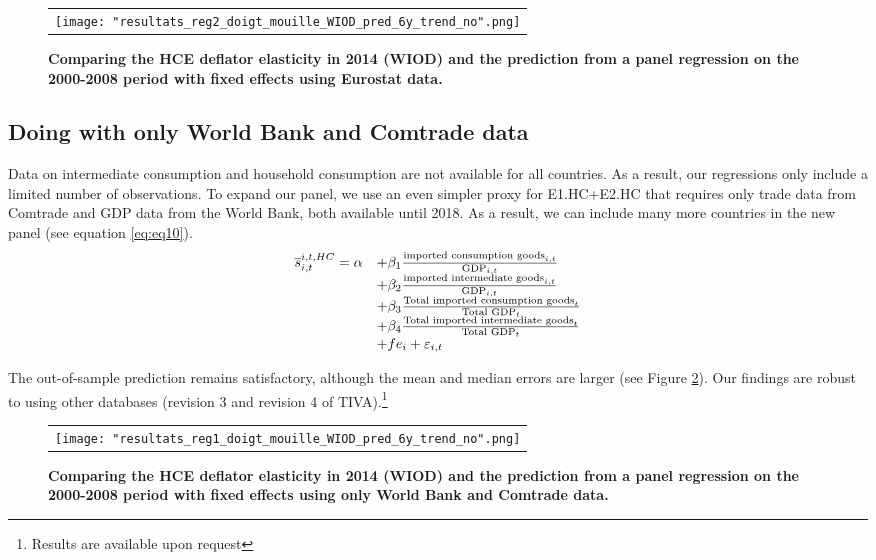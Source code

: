\documentclass[12pt,a4paper]{paper}
\begin{document}
\begin{figure}[H]
	\centering
	\caption{\footnotesize{\textbf{Comparing the HCE deflator elasticity in 2014 (WIOD) and the prediction from a panel regression on the 2000-2008 period with fixed effects using Eurostat data.}}}
	\begin{tabular}{c}
		\texttt{[image: "resultats\_reg2\_doigt\_mouille\_WIOD\_pred\_6y\_trend\_no".png]}\\
	\end{tabular}
	\label{fig:panel_pred1}
\end{figure}

\subsection{Doing with only World Bank and Comtrade data}
Data on intermediate consumption and household consumption are not available for all countries.
As a result, our regressions only include a limited number of observations.
To expand our panel, we use an even simpler proxy for E1.HC+E2.HC that requires only trade data from Comtrade and GDP data from the World Bank, both available until 2018. 
As a result, we can include many more countries in the new panel (see equation \ref{eq:eq10}).
 \begin{equation}
\begin{array}{llll}
\overline{s}_{i,t}^{i,t,HC}= \alpha & +  \beta_1  \frac{\textnormal{imported consumption goods}_{i,t}}{\textnormal{GDP}_{i,t}} \\ & + \beta_2 \frac{\textnormal{imported intermediate goods}_{i,t}}{\textnormal{GDP}_{i,t}} \\
& +  \beta_3  \frac{\textnormal{Total imported consumption goods}_{t}}{\textnormal{Total GDP}_{t}} \\
& + \beta_4 \frac{\textnormal{Total imported intermediate goods}_{t}}{\textnormal{Total GDP}_{t}} \\
& +fe_{i}+\varepsilon_{i,t}
\end{array}
\label{eq:eq10}
\end{equation}

The out-of-sample prediction remains satisfactory, although the mean and median errors are larger (see Figure \ref{fig:panel_pred2}). 
Our findings are robust to using other databases (revision 3 and revision 4 of TIVA).\footnote{Results are available upon request}


\begin{figure}[!h]
	\centering
	\caption{\footnotesize{\textbf{Comparing the HCE deflator elasticity in 2014 (WIOD) and the prediction from a panel regression on the 2000-2008 period with fixed effects using only World Bank and Comtrade data. }}}
	\begin{tabular}{c}
		\texttt{[image: "resultats\_reg1\_doigt\_mouille\_WIOD\_pred\_6y\_trend\_no".png]}\\
	\end{tabular}
	\label{fig:panel_pred2}
\end{figure}
\end{document}
